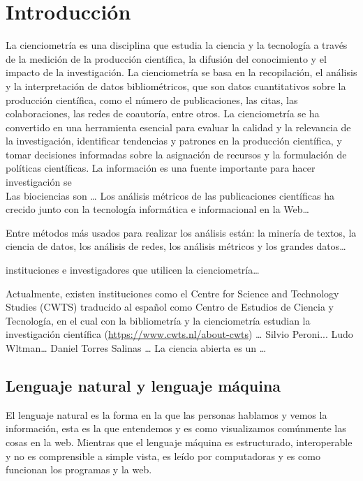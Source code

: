 \renewcommand{\chaptername}{ }
\chapter{Introducción}
La cienciometría es una disciplina que estudia la ciencia y la tecnología a través de la medición de 
la producción científica, la difusión del conocimiento y el impacto de la investigación. 
La cienciometría se basa en la recopilación, el análisis y la interpretación de datos 
bibliométricos, que son datos cuantitativos sobre la producción científica, 
como el número de publicaciones, las citas, las colaboraciones, las redes de coautoría, entre otros. 
La cienciometría se ha convertido en una herramienta esencial para evaluar la calidad y 
la relevancia de la investigación, identificar tendencias y patrones en la producción científica, 
y tomar decisiones informadas sobre la asignación de recursos y la formulación de políticas científicas. 
La información es una fuente importante para hacer investigación se \parencite{hull_defrosting_2008}\\ 
Las biociencias son …
\smallskip
Los análisis métricos de las publicaciones científicas ha crecido junto con la tecnología informática e informacional en la Web…

\smallskip
Entre métodos más usados para realizar los análisis están: la minería de textos, la ciencia de datos, los análisis de redes, los análisis métricos y los grandes datos…

\smallskip
instituciones e investigadores que utilicen la cienciometría… 

\smallskip
Actualmente, existen instituciones como el Centre for Science and Technology Studies (CWTS) traducido al español como Centro de Estudios de Ciencia y Tecnología, en el cual con la bibliometría y la cienciometría estudian la investigación científica (\url{https://www.cwts.nl/about-cwts}) …
\smallskip
Silvio Peroni... 
Ludo Wltman… 
Daniel Torres Salinas … 
La ciencia abierta es un …
\section{Lenguaje natural y lenguaje máquina}
\noindent
El lenguaje natural es la forma en la que las personas hablamos y vemos la información, esta es la que entendemos y es como visualizamos comúnmente las cosas en la web. Mientras que el lenguaje máquina es estructurado, interoperable y no es comprensible a simple vista, es leído por computadoras y es como funcionan los programas y la web. 

